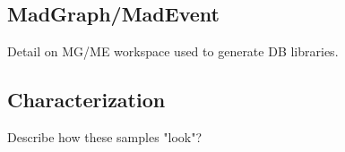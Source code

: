 \subsection{MadGraph/MadEvent}
Detail on MG/ME workspace used to generate DB libraries.

\subsection{Characterization}
Describe how these samples "look"?

